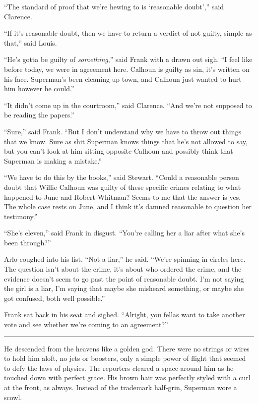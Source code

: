 \documentclass[ebook,12pt]{memoir}
\begin{document}
``The standard of proof that we're hewing to is `reasonable doubt',''
said Clarence.

``If it's reasonable doubt, then we have to return a verdict of not
guilty, simple as that,'' said Louis.

``He's gotta be guilty of \emph{something},'' said Frank with a drawn
out sigh. ``I feel like before today, we were in agreement here. Calhoun
is guilty as sin, it's written on his face. Superman's been cleaning up
town, and Calhoun just wanted to hurt him however he could.''

``It didn't come up in the courtroom,'' said Clarence. ``And we're not
supposed to be reading the papers.''

``Sure,'' said Frank. ``But I don't understand why we have to throw out
things that we know. Sure as shit Superman knows things that he's not
allowed to say, but you can't look at him sitting opposite Calhoun and
possibly think that Superman is making a mistake.''

``We have to do this by the books,'' said Stewart. ``Could a reasonable
person doubt that Willie Calhoun was guilty of these specific crimes
relating to what happened to June and Robert Whitman? Seems to me that
the answer is yes. The whole case rests on June, and I think it's damned
reasonable to question her testimony.''

``She's eleven,'' said Frank in disgust. ``You're calling her a liar
after what she's been through?''

Arlo coughed into his fist. ``Not a liar,'' he said. ``We're spinning in
circles here. The question isn't about the crime, it's about who ordered
the crime, and the evidence doesn't seem to go past the point of
reasonable doubt. I'm not saying the girl is a liar, I'm saying that
maybe she misheard something, or maybe she got confused, both well
possible.''

Frank sat back in his seat and sighed. ``Alright, you fellas want to
take another vote and see whether we're coming to an agreement?''

\begin{center}\rule{0.5\linewidth}{0.5pt}\end{center}

He descended from the heavens like a golden god. There were no strings
or wires to hold him aloft, no jets or boosters, only a simple power of
flight that seemed to defy the laws of physics. The reporters cleared a
space around him as he touched down with perfect grace. His brown hair
was perfectly styled with a curl at the front, as always. Instead of the
trademark half‐grin, Superman wore a scowl.
\end{document}
